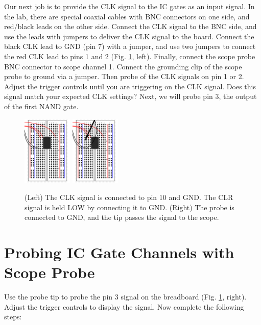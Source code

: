 \documentclass{article}
\begin{document}
Our next job is to provide the CLK signal to the IC gates as an input signal.  In the lab, there are special coaxial cables with BNC connectors on one side, and red/black leads on the other side.  Connect the CLK signal to the BNC side, and use the leads with jumpers to deliver the CLK signal to the board.  Connect the black CLK lead to GND (pin 7) with a jumper, and use two jumpers to connect the red CLK lead to pins 1 and 2 (Fig. \ref{fig:count3}, left).  Finally, connect the scope probe BNC connector to scope channel 1.  Connect the grounding clip of the scope probe to ground via a jumper.  Then probe of the CLK signals on pin 1 or 2.  Adjust the trigger controls until you are triggering on the CLK signal.  Does this signal match your expected CLK settings?  Next, we will probe pin 3, the output of the first NAND gate.

\begin{figure}[hb]
\centering
\includegraphics[width=0.21\textwidth]{breadboard_power_clk_pins.pdf}
\includegraphics[width=0.21\textwidth]{breadboard_power_clk_pins_probe.pdf}
\caption{\label{fig:count3} (Left) The CLK signal is connected to pin 10 and GND.  The CLR signal is held LOW by connecting it to GND. (Right) The probe is connected to GND, and the tip passes the signal to the scope.}
\end{figure}

\section{Probing IC Gate Channels with Scope Probe}

Use the probe tip to probe the pin 3 signal on the breadboard (Fig. \ref{fig:count3}, right).  Adjust the trigger controls to display the signal.  Now complete the following steps:
\end{document}
